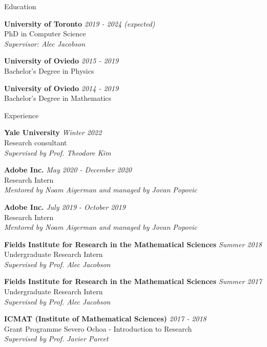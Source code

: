 \documentclass{resume}
\newcommand{\cvitembig}[4]{
    {\bf #1} \hfill {\em \small #2} \\ 
    {\small#3 }\\
    {\it \small #4}
}
\newcommand{\cvitem}[3]{
    {\bf #1} \hfill {\em \small #2} \\ 
    {\small#3 }
}
\begin{document}

\begin{rSection}{Education}

\cvitembig{University of Toronto}{2019 - 2024 (expected)}{PhD in Computer Science}{Supervisor: Alec Jacobson}

\cvitem{University of Oviedo}{2015 - 2019}{Bachelor's Degree in Physics}

\cvitem{University of Oviedo}{2014 - 2019}{Bachelor's Degree in Mathematics}

\end{rSection}


\begin{rSection}{Experience}

\cvitembig{Yale University}{Winter 2022}{Research consultant}{Supervised by Prof. Theodore Kim}

\cvitembig{Adobe Inc.}{May 2020 - December 2020}{Research Intern}{Mentored by Noam Aigerman and managed by Jovan Popovic}

\cvitembig{Adobe Inc.}{July 2019 - October 2019}{Research Intern}{Mentored by Noam Aigerman and managed by Jovan Popovic}

\cvitembig{Fields Institute for Research in the Mathematical Sciences}{Summer 2018}{Undergraduate Research Intern}{Supervised by Prof. Alec Jacobson}

\cvitembig{Fields Institute for Research in the Mathematical Sciences}{Summer 2017}{Undergraduate Research Intern}{Supervised by Prof. Alec Jacobson}

\cvitembig{ICMAT (Institute of Mathematical Sciences)}{2017 - 2018}{Grant Programme Severo Ochoa - Introduction to Research}{Supervised by Prof. Javier Parcet}

\end{rSection}
\end{document}
